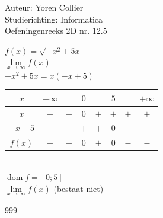 \documentclass[a4paper]{article}
\newcommand{\Lh}{\left(} %
\newcommand{\Rh}{\right)}
\newcommand{\Lv}{\left[} %
\newcommand{\Rv}{\right]}
\newcommand{\pnR}{\rightarrow} %
\newcommand{\limiet}{\lim\limits_}
\begin{document}
\noindent \large Auteur: Yoren Collier \\
\noindent \large Studierichting: Informatica\\
\noindent \large Oefeningenreeks 2D nr. 12.5\\

\medskip

\normalsize

$f(x) = \sqrt{-x^2 +5x}$\\

$\limiet{x \pnR \infty} f(x)$\\

$-x^2 +5x = x \Lh -x+5 \Rh$\\

\begin{tabular}{c|ccccccc}
    $x$     &  $-\infty$  &       &  $0$  &       &  $5$  &       &  $+\infty$  \\ \hline
    $x$     &  $-$        &  $-$  &  $0$  &  $+$  &  $+$  &  $+$  &  $+$        \\
    $-x+5$  &  $+$        &  $+$  &  $+$  &  $+$  &  $0$  &  $-$  &  $-$        \\ \hline
    $f(x)$  &  $-$        &  $-$  &  $0$  &  $+$  &  $0$  &  $-$  &  $-$        \\
\end{tabular}\\

$\operatorname{dom} f = \Lv 0;5 \Rv$\\

$\limiet{x \pnR \infty} f(x) $ (bestaat niet)\\

\begin{thebibliography}{999}
\end{thebibliography}
\end{document}
